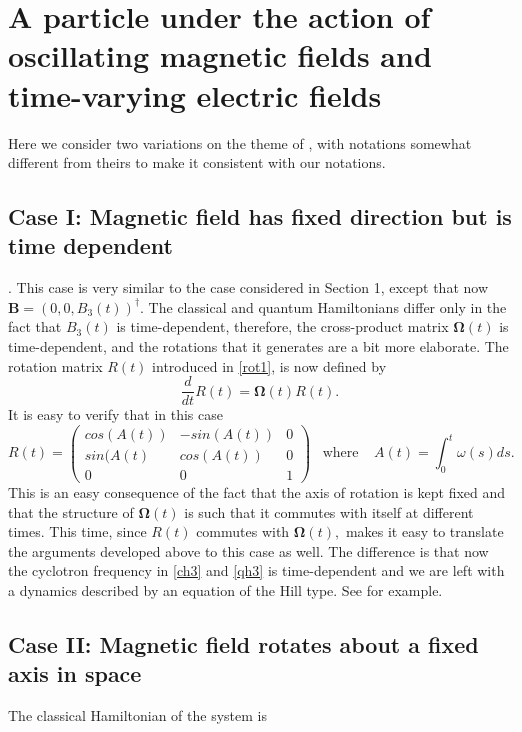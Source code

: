 \documentclass[12pt]{article}
\numberwithin{equation}{section}
\newcommand{\bOm}{{\boldsymbol \Omega}}
\def\bB{{\boldsymbol B}}
\begin{document}
\section{A particle under the action of oscillating magnetic fields and time-varying electric fields}
Here we consider two variations on the theme of \cite{dJ}, with notations somewhat different from theirs to make it consistent with our notations. 

\subsection{Case I: Magnetic field has fixed direction but is time dependent}.
This case is very similar to the case considered in Section 1, except that now $\bB=(0,0,B_3(t))^\dag.$  The classical and quantum Hamiltonians differ only in the fact that $B_3(t)$ is time-dependent, therefore, the cross-product matrix $\bOm(t)$ is time-dependent, and the rotations that it generates are a bit more elaborate.  The rotation matrix $R(t)$ introduced in \eqref{rot1}, is now defined by
\begin{equation}\label{rot3.0}
\frac{d}{dt}R(t) = \bOm(t)R(t).
\end{equation}
It is easy to verify that in this case
\begin{equation}\label{rot3.1}
R(t) = \begin{pmatrix}
		cos(A(t)) & -sin(A(t)) & 0\\
		sin(A(t)  & cos(A(t)) & 0\\
		0  & 0  & 1\end{pmatrix} \;\;\;\mbox{where}\;\;\;\;A(t)=\int_0^t\omega(s)ds.
\end{equation}
This is an easy consequence of the fact that the axis of rotation is kept fixed and that the structure of  $\bOm(t)$ is such that it commutes with itself at different times. This time, since $R(t)$ commutes with $\bOm(t),$ makes it easy to translate the arguments developed above to this case as well. The difference is that now the cyclotron frequency in \eqref{ch3} and \eqref{qh3} is time-dependent and we are left with a dynamics described by an equation of the Hill type. See \cite{MW} for example.

\subsection{Case II: Magnetic field rotates about a fixed axis in space}

The classical Hamiltonian of the system is
\end{document}
